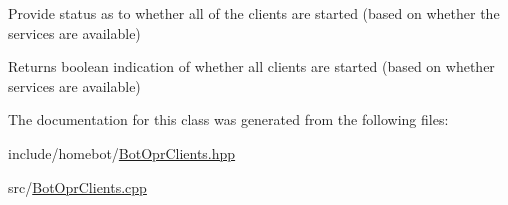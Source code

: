 Provide status as to whether all of the clients are started (based on whether the services are available) 

\begin{DoxyReturn}{Returns}
boolean indication of whether all clients are started (based on whether services are available) 
\end{DoxyReturn}


The documentation for this class was generated from the following files\-:\begin{DoxyCompactItemize}
\item 
include/homebot/\hyperlink{BotOprClients_8hpp}{Bot\-Opr\-Clients.\-hpp}\item 
src/\hyperlink{BotOprClients_8cpp}{Bot\-Opr\-Clients.\-cpp}\end{DoxyCompactItemize}
